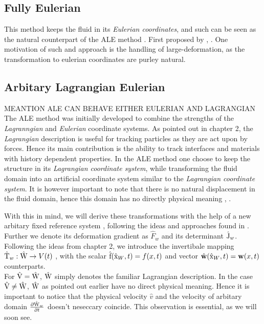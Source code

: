 \subsection{Fully Eulerian}
This method keeps the fluid in its \textit{Eulerian coordinates}, and such can be seen as the natural counterpart of the ALE method \cite{Wick2013}. First proposed by , \cite{Dunne2006}. One motivation of such and approach is the handling of large-deformation, as the transformation to eulerian coordinates are purley natural.

\subsection{Arbitary Lagrangian Eulerian}
MEANTION ALE CAN  BEHAVE EITHER EULERIAN AND LAGRANGIAN
The ALE method was initially developed to combine the strengths of the \textit{Lagranngian} and \textit{Eulerian} coordinate systems. As pointed out in chapter 2, the \textit{Lagrangian} description is useful for tracking particles as they are act upon by forces. Hence its main contribution is the ability to track interfaces and materials with history dependent properties.
In the ALE method one choose to keep the structure in its \textit{Lagrangian coordinate system}, while transforming the fluid domain into an artificial coordinate system similar to the \textit{Lagrangian coordinate system}. It is however important to note that there is no natural displacement in the fluid domain, hence this domain has no directly physical meaning \cite{Richter2010a}, \cite{Donea2004}. 
 
With this in mind, we will derive these transformations with the help of a new arbitary fixed reference system , following the ideas and approaches found in \cite{Richter2016}. Further we denote its deformation gradient as $\hat{F}_w$ and its determinant $\text{\^{J}}_w$. Following the ideas from chapter 2, we introduce the invertibale mapping $\text{\^{T}}_w : \text{\^{W}} \rightarrow V(t)$ , with the scalar $\text{\^{f}}(\text{\^{x}}_W, t) = f(x,t) $ and vector $\hat{w}(\ha{x}_W, t) = \mathbf{w}(x,t) $ counterparts.\\ 
For $\text{\^{V}} = \text{\^{W}}$, $\text{\^{W}}$ simply denotes the familiar Lagrangian description.
In the case $\text{\^{V}} \neq \text{\^{W}}$, $\text{\^{W}}$ as pointed out earlier have no direct physical meaning.  Hence it is important to notice that the physical velocity $\hat{v}$ and the velocity of arbitary domain $\frac{\partial \text{\^{W}}_w}{\partial t}$ doesn't neseccary coincide. This observation is essential, as we will soon see. \\

